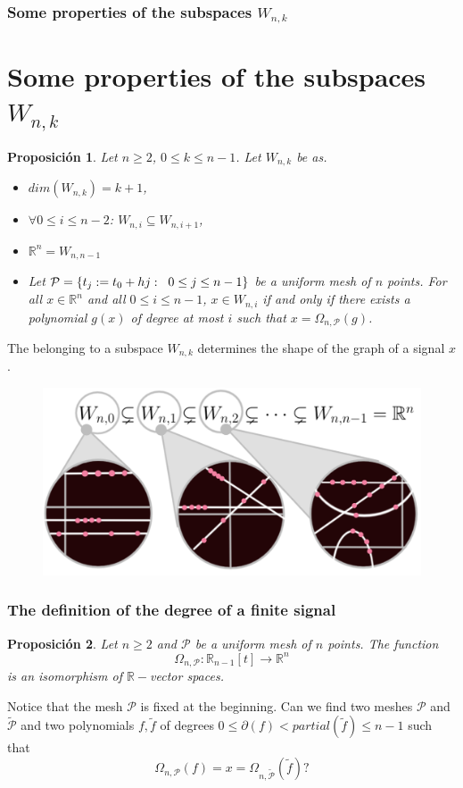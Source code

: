 \documentclass[]{beamer}
\newtheorem{prop}{\bf Proposición}
\theoremstyle{definition}
\newcommand{\IR}{\mathbb{R}}
\newcommand{\cali}[1]{\mathcal{#1}} %
\begin{document}
\begin{frame}
\frametitle{Some properties of the subspaces $W_{n,k}$}
\section{Some properties of the subspaces $W_{n,k}$}
\begin{prop}
		Let $n \geq 2$, $0 \leq k \leq n-1$. Let $W_{n,k}$
		be as.
		\begin{itemize}
		\item $dim(W_{n,k}) = k+1$, 
		\item $\forall 0 \leq i \leq n-2$: $W_{n, i} \subseteq W_{n, i+1}$,
		\item $\IR^{n} = W_{n, n-1}$
		\item Let $\cali{P} = \{ t_{j} := t_{0}+ hj : 
		\hspace{0.2cm} 0 \leq j \leq n-1 \}$ be a uniform mesh of $n$
		points. For all $x \in \IR^{n}$ and all $0 \leq i \leq n-1$, $x \in W_{n,i}$
		if and only if there exists a polynomial $g(x)$ of degree at most
		$i$ such that $x = \Omega_{n, \cali{P}}(g)$.
		\end{itemize}
\end{prop}
\end{frame}



\begin{frame}

The belonging to a subspace $W_{n,k}$
determines the shape of the graph of a signal $x$.

\begin{figure}[h]
\includegraphics[scale = 1]{nuevas_lupas}
\end{figure}
\end{frame}


\begin{frame}
\frametitle{The definition of the degree of a finite signal}


\begin{prop}
Let $n \geq 2$ and $\cali{P}$ be a uniform mesh of $n$ points.
The function 
\[
\Omega_{n, \cali{P}}: \IR_{n-1}[t] \longrightarrow \IR^{n}
\]
is an isomorphism of $\IR-$vector spaces.
\end{prop}

Notice that the mesh $\cali{P}$ is fixed at the beginning.
Can we find two meshes $\cali{P}$ and $\tilde{\cali{P}}$
and two polynomials $f, \tilde{f}$ of degrees
$0 \leq \partial(f) < partial(\tilde{f}) \leq n-1$
such that
\[
\Omega_{n, \cali{P}}(f) = x = \Omega_{n, \tilde{\cali{P}}}(\tilde{f}) ?
\]
\end{frame}
\end{document}
